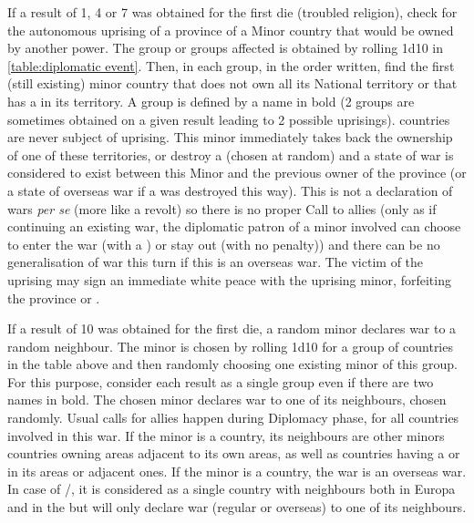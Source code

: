  \label{chEvents:diplomacy:uprising} If a result of 1, 4 or 7
was obtained for the first die (troubled religion), check for the
autonomous uprising of a province of a Minor country that would be owned
by another power.
\bparag The group or groups affected is obtained by rolling 1d10 in
\ref{table:diplomatic event}. Then, in each group, in the order
written, find the first (still existing) minor country that does not
own all its National territory or that has a \Presidio in its
territory. A group is defined by a name in bold (2 groups are
sometimes obtained on a given result leading to 2 possible uprisings).
\bparag \ROTW countries are never subject of uprising.%
\bparag This minor immediately takes back the ownership of one of these
territories, or destroy a \Presidio (chosen at random) and a state of
war is considered to exist between this Minor and the previous owner of
the province (or a state of overseas war if a \Presidio was destroyed
this way). This is not a declaration of wars \emph{per se} (more like a
revolt) so there is no proper Call to allies (only as if continuing an
existing war, the diplomatic patron of a minor involved can choose to
enter the war (with a \CB) or stay out (with no penalty)) and there can
be no generalisation of war this turn if this is an overseas war.
\bparag The \MAJ victim of the uprising may sign an immediate white
peace with the uprising minor, forfeiting the province or \Presidio.

 If a result of 10 was obtained for the
first die, a random minor declares war to a random neighbour.
\bparag The minor is chosen by rolling 1d10 for a group of countries
in the table above and then randomly choosing one existing minor of
this group. For this purpose, consider each result as a single group
even if there are two names in bold.
\bparag The chosen minor declares war to one of its neighbours, chosen
randomly.
\bparag Usual calls for allies happen during Diplomacy phase, for all
countries involved in this war.
\bparag If the minor is a \ROTW country, its neighbours are other minors
countries owning areas adjacent to its own areas, as well as countries
having a \TP or \COL in its areas or adjacent ones.
\bparag If the minor is a \ROTW country, the war is an overseas war.
\bparag In case of \paysPerse/\paysOrmus, it is considered as a single
country with neighbours both in Europa and in the \ROTW but will only
declare war (regular or overseas) to one of its neighbours.


